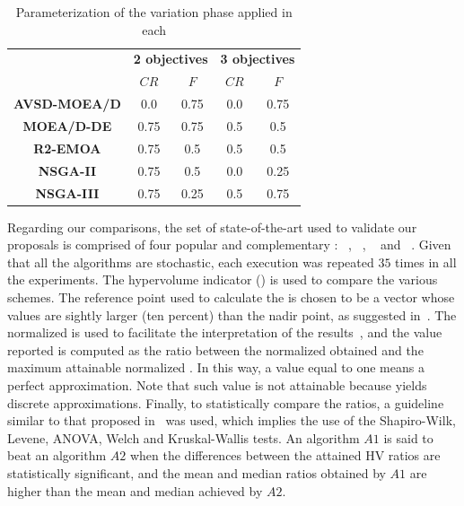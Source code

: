 \begin{table}[t]
\centering
\caption{Parameterization of the variation phase applied in each \MOEA{}}
\label{tab:tunning}
\begin{scriptsize}
\begin{tabular}{c|c|c|c|c}
\hline
\multirow{2}{*}{} &\multicolumn{2}{c|}{ \textbf{2 objectives} }& \multicolumn{2}{c}{\textbf{3 objectives} }\\ \cline{2-5} 
 & $CR$ & $F$ & $CR$ & $F$ \\ \hline
\textbf{AVSD-MOEA/D} & 0.0 & 0.75 & 0.0 & 0.75 \\ \hline
\textbf{MOEA/D-DE} & 0.75 & 0.75 & 0.5 & 0.5 \\ \hline
\textbf{R2-EMOA} & 0.75 & 0.5 & 0.5 & 0.5 \\ \hline
\textbf{NSGA-II} & 0.75 & 0.5 & 0.0 & 0.25 \\ \hline
\textbf{NSGA-III} & 0.75 & 0.25 & 0.5 & 0.75 \\ \hline
\end{tabular}%
\end{scriptsize}
\end{table}

Regarding our comparisons, the set of state-of-the-art \MOEAS{} used to validate our proposals is comprised of four 
popular and complementary \MOEAS{}: \NSGAII{}~\cite{deb2002fast}, \MOEADDE{}~\cite{zhang2009performance}, \RMOEA{}~\cite{trautmann2013r2} 
and \NSGAIII{}~\cite{deb2013evolutionary}.
%
%
%
Given that all the algorithms are stochastic, each execution was repeated $35$ times in all the experiments.
%
The hypervolume indicator (\HV{}) is used to compare the various schemes.
%
The reference point used to calculate the \HV{} is chosen to be a vector whose values are sightly larger (ten percent) 
than the nadir point, as suggested in~\cite{ishibuchi2017reference}.
%
The normalized \HV{} is used to facilitate the interpretation of the results~\cite{li2014evolutionary}, 
and the value reported is computed as the ratio between the normalized \HV{} obtained and the maximum attainable normalized \HV{}.
%
In this way, a value equal to one means a perfect approximation.
%
Note that such value is not attainable because \MOEAS{} yields discrete approximations.
%
Finally, to statistically compare the \HV{} ratios, a guideline similar to that proposed in~\cite{durillo2010study} was used, 
which implies the use of the Shapiro-Wilk, Levene, ANOVA, Welch and Kruskal-Wallis tests.
%
An algorithm $A1$ is said to beat an algorithm $A2$ when the differences between the attained HV ratios are statistically significant, 
and the mean and median \HV{} ratios obtained by $A1$ are higher than the mean and median achieved by $A2$.

